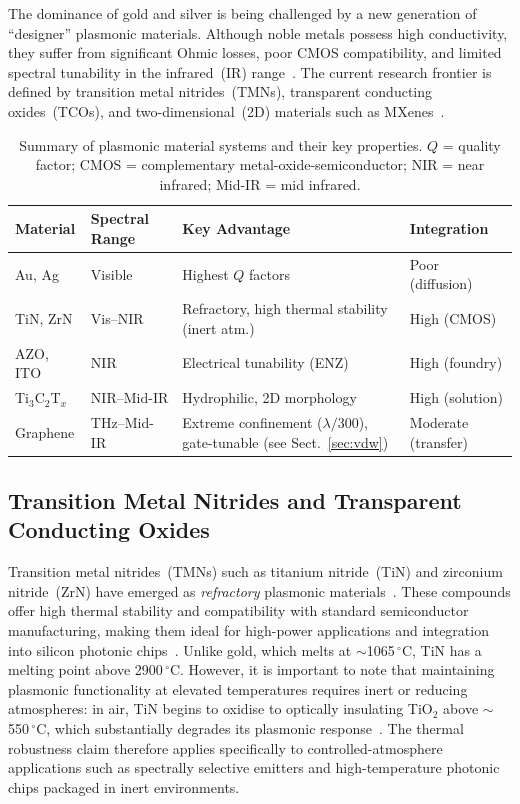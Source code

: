 \documentclass[twocolumn,10pt]{article}
\begin{document}
The dominance of gold and silver is being challenged by a new generation
of ``designer'' plasmonic materials.  Although noble metals possess high
conductivity, they suffer from significant Ohmic losses, poor CMOS
compatibility, and limited spectral tunability in the infrared~(IR)
range~\cite{maier2007plasmonics,naik2013alternative}.  The current
research frontier is defined by transition metal nitrides~(TMNs),
transparent conducting oxides~(TCOs), and two-dimensional~(2D) materials
such as MXenes~\cite{naik2013alternative,naguib2014mxene,gogotsi2019rise}.

\begin{table}[H]
\small
\centering
\caption{Summary of plasmonic material systems and their key properties.
$Q$ = quality factor; CMOS = complementary metal-oxide-semiconductor;
NIR = near infrared; Mid-IR = mid infrared.}
\label{tab:materials}
\begin{tabularx}{\columnwidth}{@{}lXXX@{}}
\toprule
\textbf{Material} & \textbf{Spectral Range} &
\textbf{Key Advantage} & \textbf{Integration} \\
\midrule
Au, Ag & Visible & Highest $Q$ factors &
  Poor (diffusion) \\
TiN, ZrN & Vis--NIR & Refractory, high thermal stability (inert atm.) &
  High (CMOS) \\
AZO, ITO & NIR & Electrical tunability (ENZ) &
  High (foundry) \\
Ti$_3$C$_2$T$_x$ & NIR--Mid-IR & Hydrophilic, 2D morphology &
  High (solution) \\
Graphene & THz--Mid-IR & Extreme confinement ($\lambda/300$), gate-tunable (see Sect.~\ref{sec:vdw}) &
  Moderate (transfer) \\
\bottomrule
\end{tabularx}
\end{table}

\subsection{Transition Metal Nitrides and Transparent Conducting Oxides}

Transition metal nitrides~(TMNs) such as titanium nitride~(TiN) and
zirconium nitride~(ZrN) have emerged as \textit{refractory} plasmonic
materials~\cite{guler2015refractory}.  These compounds offer high thermal
stability and compatibility with standard semiconductor manufacturing,
making them ideal for high-power applications and integration into silicon
photonic chips~\cite{guler2015refractory}.  Unlike gold, which melts at
$\sim$1065\,$^\circ$C, TiN has a melting point above 2900\,$^\circ$C.
However, it is important to note that maintaining plasmonic functionality
at elevated temperatures requires inert or reducing atmospheres: in
air, TiN begins to oxidise to optically insulating TiO$_2$ above
$\sim$550\,$^\circ$C, which substantially degrades its plasmonic
response~\cite{guler2015refractory,boltasseva2011low}.  The thermal
robustness claim therefore applies specifically to controlled-atmosphere
applications such as spectrally selective emitters and high-temperature
photonic chips packaged in inert environments.
\end{document}
